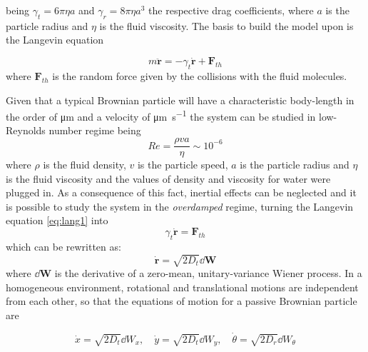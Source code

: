 \documentclass[../../master_thesis_np.tex]{subfiles}
\begin{document}
	being $\gamma_t = 6 \pi \eta a$ and $\gamma_r = 8 \pi \eta a^3$  the respective drag coefficients, where $a$ is the particle radius and $\eta$ is the fluid viscosity. 
	The basis to build the model upon is the Langevin equation
	
	\begin{equation} \label{eq:lang1}
		m \mathbf{\ddot{r}} = -\gamma_t \mathbf{\dot{r}} + \mathbf{F}_{th}
	\end{equation} 
	where $\mathbf{F}_{th}$ is the random force given by the collisions with the fluid molecules.
	
	Given that a typical Brownian particle will have a characteristic body-length in the order of \unit{\um} and a velocity of \unit{\um \per \second} the system can be studied in low-Reynolds number regime being 
	\begin{equation}
	Re = \frac{\rho v a}{\eta} \sim 10^{-6} 
	\end{equation}  
	where $\rho$ is the fluid density, $v$ is the particle speed, $a$ is the particle radius and $\eta$ is the fluid viscosity and the values of density and viscosity for water were plugged in. 
	As a consequence of this fact, inertial effects can be neglected and it is possible to study the system in the \emph{overdamped} regime, turning the Langevin equation \ref{eq:lang1} into
	\begin{equation} \label{eq:lang2}
		\gamma_t \mathbf{\dot{r}} = \mathbf{F}_{th}
	\end{equation}
	which can be rewritten as:
	\begin{equation}
		\mathbf{\dot{r}} = \sqrt{2D_t} \dd{\mathbf{W}}
	\end{equation}
	where $\dd{\mathbf{W}}$ is the derivative of a zero-mean, unitary-variance Wiener process.
	In a homogeneous environment, rotational and translational motions are independent from each other, so that the equations of motion for a passive Brownian particle are
	
	\begin{equation}
		\dot{x} = \sqrt{2D_t}\dd{W_x}, \quad \dot{y} = \sqrt{2D_t}\dd{W_y}, \quad \dot{\theta} = \sqrt{2D_r}\dd{W_{\theta}}
	\end{equation}
	
	
\end{document}

